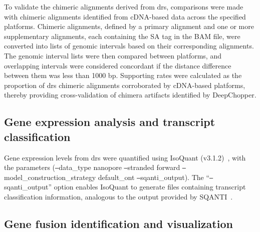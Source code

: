 \documentclass[pdflatex,sn-nature, lineno]{sn-jnl}%
\begin{document}
To validate the chimeric alignments derived from \gls{drs}, comparisons were made with chimeric alignments identified from cDNA-based data across the specified platforms. Chimeric alignments, defined by a primary alignment and one or more supplementary alignments, each containing the SA tag in the BAM file, were converted into lists of genomic intervals based on their corresponding alignments. The genomic interval lists were then compared between platforms, and overlapping intervals were considered concordant if the distance difference between them was less than 1000 bp. Supporting rates were calculated as the proportion of \gls{drs} chimeric alignments corroborated by cDNA-based platforms, thereby providing cross-validation of chimera artifacts identified by DeepChopper.



\subsection{Gene expression analysis and transcript classification}

Gene expression levels from \gls{drs} were quantified using IsoQuant (v3.1.2)~\cite{prjibelski2023accurate}, with the parameters (\texttt{--}data\_type nanopore \texttt{--}stranded forward \texttt{--}model\_construction\_strategy default\_ont \texttt{--}sqanti\_output). The ``\texttt{--}sqanti\_output'' option enables IsoQuant to generate files containing transcript classification information, analogous to the output provided by SQANTI~\cite{tardaguila2018sqanti}.


\subsection{Gene fusion identification and visualization}
\end{document}

